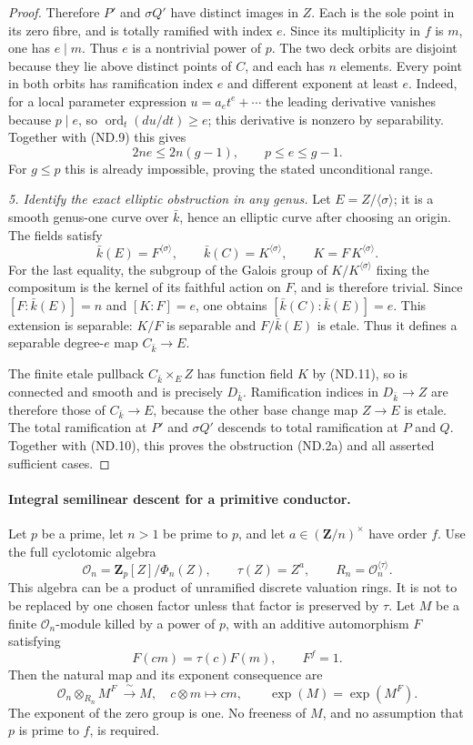 \begin{proof}
Therefore $P'$ and $\sigma Q'$ have distinct images in $Z$.
Each is the sole point in its zero fibre, and is totally
ramified with index $e$. Since its multiplicity in $f$ is $m$,
one has $e\mid m$. Thus $e$ is a nontrivial power of $p$.
The two deck orbits are disjoint because they lie above distinct
points of $C$, and each has $n$ elements. Every point in both
orbits has ramification index $e$ and different exponent at
least $e$. Indeed, for a local parameter expression
$u=a_et^e+\cdots$ the leading derivative vanishes because
$p\mid e$, so $\operatorname{ord}_t(du/dt)\ge e$; this derivative
is nonzero by separability. Together with (ND.9) this gives
\[
                   2ne\le2n(g-1),\qquad p\le e\le g-1.
 \tag{ND.10}
\]
For $g\le p$ this is already impossible, proving the stated
unconditional range.

\emph{5. Identify the exact elliptic obstruction in any genus.}
Let $E=Z/\langle\sigma\rangle$; it is a smooth genus-one
curve over $\bar k$, hence an elliptic curve after choosing
an origin. The fields satisfy
\[
 \bar k(E)=F^{\langle\sigma\rangle},\qquad
 \bar k(C)=K^{\langle\sigma\rangle},\qquad
 K=F\,K^{\langle\sigma\rangle}.
 \tag{ND.11}
\]
For the last equality, the subgroup of the Galois group of
$K/K^{\langle\sigma\rangle}$ fixing the compositum is the
kernel of its faithful action on $F$, and is therefore trivial.
Since $[F:\bar k(E)]=n$ and $[K:F]=e$, one obtains
$[\bar k(C):\bar k(E)]=e$. This extension is separable:
$K/F$ is separable and $F/\bar k(E)$ is etale. Thus it defines
a separable degree-$e$ map $C_{\bar k}\to E$.

The finite etale pullback $C_{\bar k}\times_E Z$ has function
field $K$ by (ND.11), so is connected and smooth and is precisely
$D_{\bar k}$. Ramification indices in $D_{\bar k}\to Z$ are
therefore those of $C_{\bar k}\to E$, because the other base
change map $Z\to E$ is etale. The total ramification at $P'$
and $\sigma Q'$ descends to total ramification at $P$ and $Q$.
Together with (ND.10), this proves the obstruction (ND.2a)
and all asserted sufficient cases.
\end{proof}

\paragraph{Integral semilinear descent for a primitive conductor.}
Let $p$ be a prime, let $n>1$ be prime to $p$, and let
$a\in(\mathbf Z/n)^\times$ have order
$f$.  Use the full cyclotomic algebra
\[
 \mathcal O_n=\mathbf Z_p[Z]/\Phi_n(Z),\qquad
 \tau(Z)=Z^a,\qquad R_n=\mathcal O_n^{\langle\tau\rangle}.
 \tag{SD.1}
\]
This algebra can be a product of unramified discrete valuation
rings.  It is not to be replaced by one chosen factor unless
that factor is preserved by $\tau$.
Let $M$ be a finite $\mathcal O_n$-module killed by a power of
$p$, with an additive automorphism $F$ satisfying
\[
 F(cm)=\tau(c)F(m),\qquad F^f=1.
 \tag{SD.2}
\]
Then the natural map and its exponent consequence are
\[
 \mathcal O_n\otimes_{R_n}M^F\ \xrightarrow{\ \sim\ } M,
 \quad c\otimes m\longmapsto cm,
 \qquad \exp(M)=\exp(M^F).
 \tag{SD.3}
\]
The exponent of the zero group is one.  No freeness of $M$,
and no assumption that $p$ is prime to $f$, is required.

